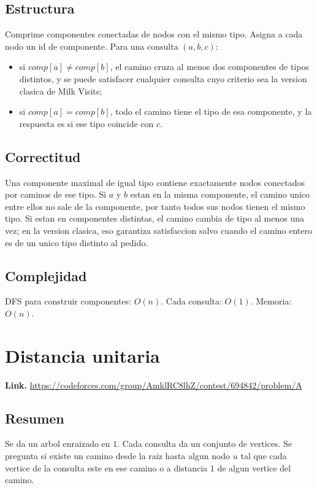 \documentclass[10pt]{article}
\newcommand{\bigO}{O}
\begin{document}
\subsection*{Estructura}
Comprime componentes conectadas de nodos con el mismo tipo. Asigna a cada nodo
un id de componente. Para una consulta $(a,b,c)$:
\begin{itemize}[leftmargin=*]
\item si $comp[a]\ne comp[b]$, el camino cruza al menos dos componentes de tipos
distintos, y se puede satisfacer cualquier consulta cuyo criterio sea la version
clasica de Milk Visits;
\item si $comp[a]=comp[b]$, todo el camino tiene el tipo de esa componente, y la
respuesta es si ese tipo coincide con $c$.
\end{itemize}

\subsection*{Correctitud}
Una componente maximal de igual tipo contiene exactamente nodos conectados por
caminos de ese tipo. Si $a$ y $b$ estan en la misma componente, el camino unico
entre ellos no sale de la componente, por tanto todos sus nodos tienen el mismo
tipo. Si estan en componentes distintas, el camino cambia de tipo al menos una
vez; en la version clasica, eso garantiza satisfaccion salvo cuando el camino
entero es de un unico tipo distinto al pedido.

\subsection*{Complejidad}
DFS para construir componentes: $\bigO(n)$. Cada consulta: $\bigO(1)$. Memoria:
$\bigO(n)$.

\clearpage
\section{Distancia unitaria}
\textbf{Link.} \url{https://codeforces.com/group/AmklRC8lhZ/contest/694842/problem/A}

\subsection*{Resumen}
Se da un arbol enraizado en $1$. Cada consulta da un conjunto de vertices. Se
pregunta si existe un camino desde la raiz hasta algun nodo $u$ tal que cada
vertice de la consulta este en ese camino o a distancia $1$ de algun vertice del
camino.
\end{document}

